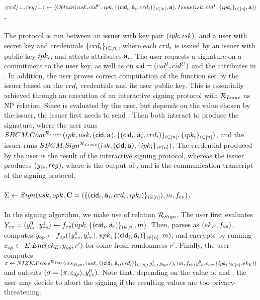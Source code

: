 \paragraph{$\langle crd/\bot,reg/\bot \rangle \gets
  \langle Obtain(usk,cid^U,ipk,\lbrace (\mathsf{cid}_i,\tilde{\mathbf{a}}_i,crd_i) \rbrace_{i\in[n]},
  \mathbf{a}),Issue(isk,cid^I,\lbrace ipk_i \rbrace_{i\in[n]},\mathbf{a})\rangle$.} %
The protocol is run between an issuer with key pair $(ipk,isk)$, and a user
with secret key \usk and credentials $\lbrace crd_i \rbrace_{i\in[n]}$, where
each $crd_i$ is issued by an issuer with public key $ipk_i$, and
attests attributes $\tilde{\mathbf{a}}_i$. The user requests a signature on a commitment to
the user key, as well as on $\mathsf{cid}=(cid^I,cid^U)$ and the attributes in \attrs.
In addition, the user proves correct computation of the \fissue function set by
the issuer based on the $crd_i$ credentials and its user public key.
This is essentially achieved through an execution of an \SBCM interactive
signing protocol with $\mathcal{R}_{Issue}$ as NP relation. Since \fissue is
evaluated by the user, but depends on the \cidi value chosen by the issuer, the
issuer first needs to send \cidi.
Then both interact to produce the \SBCM signature, where the
user runs $SBCM.Com^{\mathcal{R}_{Issue}}(ipk,usk,(\mathsf{cid},\mathbf{a}),\lbrace (\mathsf{cid}_i,
\tilde{\mathbf{a}}_i,crd_i)\rbrace_{i\in[n]},\lbrace ipk_i \rbrace_{i\in[n]})$, and the
issuer runs $SBCM.Sign^{\mathcal{R}_{Issue}}(isk,(\mathsf{cid},\mathbf{a}),\lbrace ipk_i
\rbrace_{i\in[n]})$. The credential \cred produced by the user is the result of
the interactive signing protocol, whereas the issuer produces $(y_{is},
reg)$, where \yissue is the output of \fissue, and \utrans is the
communication transcript of the signing protocol.%

\paragraph{$\Sigma \gets Sign(usk,opk,
  \mathbf{C}=(\lbrace (\mathsf{cid}_i,\tilde{\mathbf{a}}_i,crd_i,ipk_i)\rbrace_{i\in[n]}),
  m,f_{ev})$.} %
In the signing algorithm, we make use of relation $\mathcal{R}_{Sign}$.
% 
The user first evaluates $Y_{ev} = (y_{ev}^0,y_{ev}^1) \gets f_{ev} (upk,
\lbrace(\mathsf{cid}_i,\tilde{\mathbf{a}}_i)\rbrace_{i\in[n]},m)$. Then, parses \opk as $(ek_{E},
f_{op})$, computes $y_{op} \gets f_{op}((y_{ev}^0,y_{ev}^1),upk,
\lbrace(\mathsf{cid}_i,\tilde{\mathbf{a}}_i)\rbrace_{i\in[n]},m)$, and encrypts
\yinsp by running $c_{op} \gets E.Enc(ek_{E},y_{op}; r')$ for some fresh
randomness $r'$. Finally, the user
computes $\pi \gets NIZK.Prove^{\mathcal{R}_{Sign}}(crs_{Sign},(usk,
\lbrace(\mathsf{cid}_i,\tilde{\mathbf{a}}_i,crd_i)\rbrace_{i\in[n]},y_{ev}^1,y_{op},r),(m,
f_{ev},y_{ev}^0,c_{op},\lbrace ipk_i\rbrace_{i\in[n]},ek_{E}))$ and outputs
$(\sigma = (\pi,c_{op}),y_{ev}^0)$. Note that, depending on the value of
\Yeval and \yinsp, the user may decide to abort
the signing if the resulting values are too privacy-threatening.

